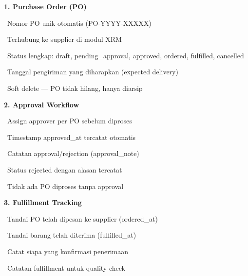 \documentclass[a4paper]{article}
\begin{document}
\noindent
\begin{minipage}[t]{0.485\textwidth}

    {\fontsize{10.5}{13}\selectfont\bfseries\color{OrangePrimary} 1. Purchase Order (PO)}
    \vspace{3pt}

    {\fontsize{9}{13}\selectfont\color{TextDark}%
    \textbullet\ Nomor PO unik otomatis (PO-YYYY-XXXXX)\par\vspace{2pt}%
    \textbullet\ Terhubung ke supplier di modul XRM\par\vspace{2pt}%
    \textbullet\ Status lengkap: draft, pending\_approval, approved, ordered, fulfilled, cancelled\par\vspace{2pt}%
    \textbullet\ Tanggal pengiriman yang diharapkan (expected delivery)\par\vspace{2pt}%
    \textbullet\ Soft delete --- PO tidak hilang, hanya diarsip}%
    \vspace{8pt}

    {\fontsize{10.5}{13}\selectfont\bfseries\color{OrangePrimary} 2. Approval Workflow}
    \vspace{3pt}

    {\fontsize{9}{13}\selectfont\color{TextDark}%
    \textbullet\ Assign approver per PO sebelum diproses\par\vspace{2pt}%
    \textbullet\ Timestamp approved\_at tercatat otomatis\par\vspace{2pt}%
    \textbullet\ Catatan approval/rejection (approval\_note)\par\vspace{2pt}%
    \textbullet\ Status rejected dengan alasan tercatat\par\vspace{2pt}%
    \textbullet\ Tidak ada PO diproses tanpa approval}%
    \vspace{8pt}

    {\fontsize{10.5}{13}\selectfont\bfseries\color{OrangePrimary} 3. Fulfillment Tracking}
    \vspace{3pt}

    {\fontsize{9}{13}\selectfont\color{TextDark}%
    \textbullet\ Tandai PO telah dipesan ke supplier (ordered\_at)\par\vspace{2pt}%
    \textbullet\ Tandai barang telah diterima (fulfilled\_at)\par\vspace{2pt}%
    \textbullet\ Catat siapa yang konfirmasi penerimaan\par\vspace{2pt}%
    \textbullet\ Catatan fulfillment untuk quality check}%

\end{minipage}%
\end{document}
